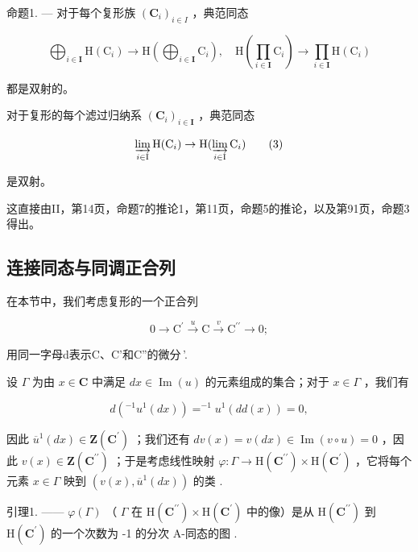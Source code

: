 命题1. --- 对于每个复形族 \((\mathbf{C}_{i})_{i\in I}\) ，典范同态

\[
\bigoplus_ {i \in \mathbf {I}} \mathrm{H} (\mathrm{C} _ {i}) \rightarrow \mathrm{H} \left(\bigoplus_ {i \in \mathbf {I}} \mathrm{C} _ {i}\right), \quad \mathrm{H} \left(\prod_ {i \in \mathbf {I}} \mathrm{C} _ {i}\right)\rightarrow \prod_ {i \in \mathbf {I}} \mathrm{H} (\mathrm{C} _ {i})\tag{2}
\]

都是双射的。

对于复形的每个滤过归纳系 \((\mathbf{C}_{i})_{i\in\mathbf{I}}\) ，典范同态

\[
\varinjlim_ {i \in \mathrm{I}} \mathrm{H} (\mathrm{C} _ {i}) \to \mathrm{H} (\varinjlim_ {i \in \mathrm{I}} \mathrm{C} _ {i})\tag{3}
\]

是双射。

这直接由II，第14页，命题7的推论1，第11页，命题5的推论，以及第91页，命题3得出。

\subsection{连接同态与同调正合列}

在本节中，我们考虑复形的一个正合列

\[
0 \longrightarrow \mathrm{C} ^ {\prime} \stackrel {u} {\longrightarrow} \mathrm{C} \stackrel {v} {\longrightarrow} \mathrm{C} ^ {\prime \prime} \longrightarrow 0;
\]

用同一字母d表示C、C'和C''的微分\,'.

设 \(\Gamma\) 为由 \(x \in \mathbf{C}\) 中满足 \(dx \in \operatorname{Im}(u)\) 的元素组成的集合；对于 \(x \in \Gamma\) ，我们有

\[
d \left(^ {- 1} u ^ {1} (d x)\right) = ^ {- 1} u ^ {1} (d d (x)) = 0,
\]

因此 \(\overline{u}^{1}(dx)\in\mathbf{Z}(\mathbf{C}^{\prime})\) ；我们还有 \(dv(x)=v(dx)\in\operatorname{Im}(v\circ u)=0\) ，因此 \(v(x)\in\mathbf{Z}(\mathbf{C}^{\prime\prime})\) ；于是考虑线性映射 \(\varphi:\Gamma\to\mathrm{H}(\mathbf{C}^{\prime\prime})\times\mathrm{H}(\mathbf{C}^{\prime})\) ，它将每个元素 \(x\in\Gamma\) 映到 \((v(x),\overline{u}^{1}(dx))\) 的类 .

引理1. —— \(\varphi(\Gamma)\) （ \(\Gamma\) 在 \(\mathrm{H}(\mathbf{C}^{\prime\prime}) \times \mathrm{H}(\mathbf{C}^{\prime})\) 中的像）是从 \(\mathrm{H}(\mathbf{C}^{\prime\prime})\) 到 \(\mathrm{H}(\mathbf{C}^{\prime})\) 的一个次数为 -1 的分次 A-同态的图 .

